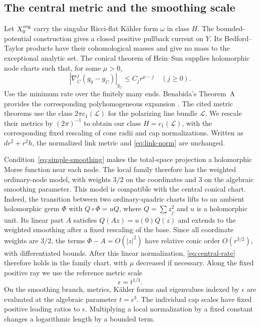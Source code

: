\subsection{The central metric and the smoothing scale}
Let $X_0^{\mathrm{reg}}$ carry the singular Ricci-flat K\"ahler form $\omega$ in
class $H$. The bounded-potential construction \cite[\S7.2, Theorem~7.5 and Corollary~7.6]{egz} gives a closed positive pullback current on $Y$. Its
Bedford--Taylor products have their cohomological masses and give no mass
to the exceptional analytic set. The conical theorem of Hein--Sun
\cite[Theorem~1.4 and Corollary~1.5]{hein-sun} supplies holomorphic node
charts such that, for some $\mu>0$,
\begin{equation}\label{eq:central-rate}
 |\nabla_C^j(g_0-g_C)|_{g_C}\le C_jr^{\mu-j}
 \quad (j\ge0).
\end{equation}
Use the minimum rate over the finitely many ends. Benabida's Theorem~A
provides the corresponding polyhomogeneous expansion \cite{benabida}.
The cited metric theorems use the class $2\pi c_1(\mathcal L)$ for
the polarizing line bundle $\mathcal L$. We rescale their metrics by
$(2\pi)^{-1}$ to obtain our class $H=c_1(\mathcal L)$, with the corresponding fixed rescaling
of cone radii and cap normalizations. Written as $dr^2+r^2h$, the
normalized link metric and \eqref{eq:link-norm} are unchanged.

Condition~\eqref{eq:simple-smoothing} makes the total-space projection a
holomorphic Morse function near each node. The local family therefore
has the weighted ordinary-node model, with weights $3/2$ on the coordinates
and $3$ on the algebraic smoothing parameter. This model is compatible
with the central conical chart. Indeed, the transition between two
ordinary-quadric charts lifts to an ambient holomorphic germ $\Phi$ with
$Q\circ\Phi=uQ$, where $Q=\sum z_j^2$ and $u$ is a holomorphic unit.
Its linear part $A$ satisfies $Q(Az)=u(0)Q(z)$ and extends to the
weighted smoothing after a fixed rescaling of the base. Since all
coordinate weights are $3/2$, the terms $\Phi-A=O(|z|^2)$ have relative
conic order $O(r^{3/2})$, with differentiated bounds. After this linear
normalization, \eqref{eq:central-rate} therefore holds in the family
chart, with $\mu$ decreased if necessary. Along the fixed positive ray
we use the reference metric scale
\begin{equation}\label{eq:metric-scale}
 \epsilon=t^{1/3}.
\end{equation}
On the smoothing branch, metrics, K\"ahler forms and eigenvalues indexed
by $\epsilon$ are evaluated at the algebraic parameter $t=\epsilon^3$.
The individual cap scales have fixed positive leading ratios to $\epsilon$.
Multiplying a local normalization by a fixed constant changes a logarithmic
length by a bounded term.

